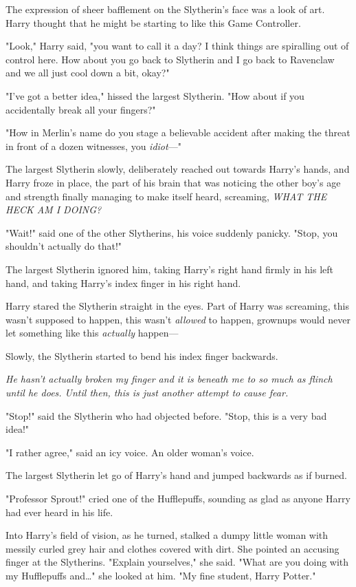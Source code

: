 The expression of sheer bafflement on the Slytherin's face was a look of art. 
Harry thought that he might be starting to like this Game Controller.

"Look," Harry said, "you want to call it a day? I think things are spiralling 
out of control here. How about you go back to Slytherin and I go back to 
Ravenclaw and we all just cool down a bit, okay?"

"I've got a better idea," hissed the largest Slytherin. "How about if you 
accidentally break all your fingers?"

"How in Merlin's name do you stage a believable accident after making the 
threat in front of a dozen witnesses, you \emph{idiot}---"

The largest Slytherin slowly, deliberately reached out towards Harry's hands, 
and Harry froze in place, the part of his brain that was noticing the other 
boy's age and strength finally managing to make itself heard, screaming, 
\emph{WHAT THE HECK AM I DOING?}

"Wait!" said one of the other Slytherins, his voice suddenly panicky. "Stop, 
you shouldn't actually do that!"

The largest Slytherin ignored him, taking Harry's right hand firmly in his left 
hand, and taking Harry's index finger in his right hand.

Harry stared the Slytherin straight in the eyes. Part of Harry was screaming, 
this wasn't supposed to happen, this wasn't \emph{allowed} to happen, grownups 
would never let something like this \emph{actually} happen---

Slowly, the Slytherin started to bend his index finger backwards.

\emph{He hasn't actually broken my finger and it is beneath me to so much as 
flinch until he does. Until then, this is just another attempt to cause fear.}

"Stop!" said the Slytherin who had objected before. "Stop, this is a very bad 
idea!"

"I rather agree," said an icy voice. An older woman's voice.

The largest Slytherin let go of Harry's hand and jumped backwards as if burned.

"Professor Sprout!" cried one of the Hufflepuffs, sounding as glad as anyone 
Harry had ever heard in his life.

Into Harry's field of vision, as he turned, stalked a dumpy little woman with 
messily curled grey hair and clothes covered with dirt. She pointed an accusing 
finger at the Slytherins. "Explain yourselves," she said. "What are you doing 
with my Hufflepuffs and{\ldots}" she looked at him. "My fine student, Harry 
Potter."

